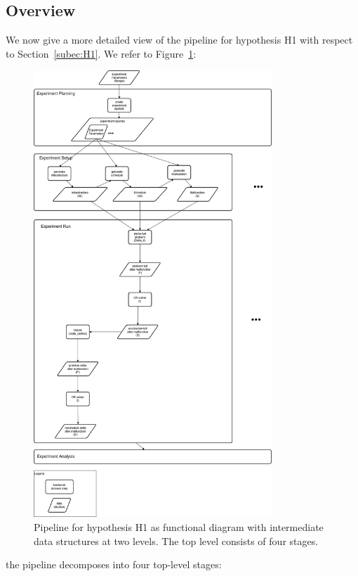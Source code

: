 \documentclass{article}
\begin{document}
\subsection{Overview}\label{subsubsec:H1overview}
We now give a more detailed view of the pipeline for hypothesis H1 with respect to Section~\ref{subec:H1}. We refer to Figure~\ref{fig:H1_overview}:
%
\begin{figure}[hbtp]
	\centering
  \includegraphics[width=0.8\textwidth]{H1_overview.png}
	\caption{Pipeline for hypothesis H1 as functional diagram with intermediate data structures at two levels. The top level consists of four stages.}
	\label{fig:H1_overview}
\end{figure}
%
the pipeline decomposes into four top-level stages:
\end{document}
